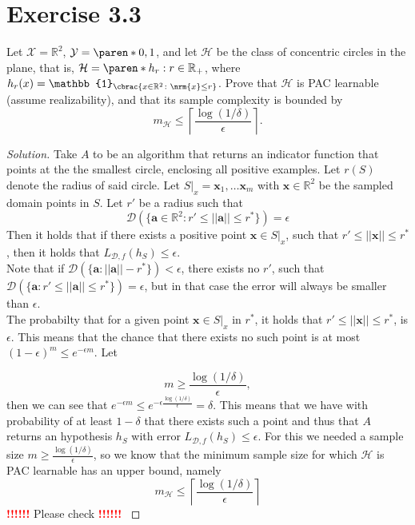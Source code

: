 \documentclass[10pt, a4paper, twoside]{amsart}
\newcommand{\R}{\ensuremath{\mathbb{R}}}
\DeclarePairedDelimiter\cbrac\{\}
\DeclarePairedDelimiter\paren()
\DeclarePairedDelimiter{\nrm}\lVert\rVert
\renewcommand{\c}{\ensuremath{\colon}}
\newcommand{\Ind}{\ensuremath{\mathbb{1}}}
\newenvironment{solution}
               {\let\oldqedsymbol=\qedsymbol
                \renewcommand{\qedsymbol}{$\blacktriangleleft$}
                \begin{proof}[Solution]}
               {\end{proof}
                \renewcommand{\qedsymbol}{\oldqedsymbol}}
\newcommand{\TODO}{\textcolor{red}{\textbf{!!!!!! }}}
\begin{document}
\section*{Exercise 3.3}
Let $\mathcal{X} = \R^2$, $\mathcal{Y} = \paren*{0,1}$, and let $\mathcal{H}$ be the class of concentric circles in the plane, that is, $\mathcal{H}=\paren*{h_r:r \in \R_+}$, where $h_r(x) = \Ind_{\cbrac{x \in \R^2\c\nrm{x} \leq r}}$. Prove that $\mathcal{H}$ is PAC learnable (assume realizability), and that its sample complexity is bounded by
\begin{equation*}
  m_{\mathcal{H}}\leq \left\lceil \frac{\log(1/\delta )}{\epsilon} \right\rceil .
\end{equation*}
\begin{solution}
  Take $A$ to be an algorithm that returns an indicator function that points at the the smallest circle, enclosing all positive examples. Let $r(S)$ denote the radius of said circle.
  Let $S|_x  = \mathbf{x}_1,\ldots \mathbf{x}_m$ with $\mathbf{x} \in \R^2$ be the sampled domain points in $S$. 
  Let $r'$ be a radius such that
  \begin{equation*}
    \mathcal{D}(\{\mathbf{a} \in \R^2 : r'\leq||\mathbf{a}|| \leq r^*\}) = \epsilon
  \end{equation*}
  Then it holds that if there exists a positive point $\mathbf{x} \in S|_x$, such that $r' \leq ||\mathbf{x}||\leq r^*$, then it holds that $L_{\mathcal{D},f}(h_S)\leq \epsilon$.\\
Note that if $\mathcal{D}(\{\mathbf{a}:||\mathbf{a}||-r^{*}\}) < \epsilon $, there exists no $r'$, such that $\mathcal{D}(\{\mathbf{a}:r'\leq||\mathbf{a}|| \leq r^*\}) = \epsilon$, but in that case the error will always be smaller than $\epsilon$.\\
  The probabilty that for a given point $\mathbf{x} \in S|_{x}$ in $r^*$, it holds that $r' \leq ||\mathbf{x}||\leq r^*$, is $\epsilon$. This means that the chance that there exists no such point is at most $(1-\epsilon)^m \leq e^{-\epsilon m}$. Let

\begin{equation*}
  m \geq \frac{\log(1/\delta)}{\epsilon},
\end{equation*}
then we can see that $e^{-\epsilon m} \leq e^{-\epsilon \frac{\log(1/\delta)}{\epsilon}} = \delta$. This means that we have with probability of at least $1- \delta$ that there exists such a point and thus that $A$ returns an hypothesis $h_S$ with error $L_{\mathcal{D},f}(h_S) \leq \epsilon$. For this we needed a sample size $m \geq \frac{\log(1/\delta)}{\epsilon}$, so we know that the minimum sample size for which $\mathcal{H}$ is PAC learnable has an upper bound, namely 
  \begin{equation*}
    m_{\mathcal{H}}\leq \left\lceil \frac{\log(1/\delta )}{\epsilon} \right\rceil
  \end{equation*}
  \TODO Please check \TODO
  

\end{solution}
\end{document}
